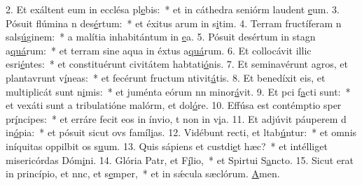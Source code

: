 2. Et exáltent eum in ecclésa pl\uline{e}bis:~* et in cáthedra seniórm laudent \uline{e}um.
3. Pósuit flúmina n des\uline{é}rtum:~* et éxitus arum in s\uline{i}tim.
4. Terram fructíferam n sals\uline{ú}ginem:~* a malítia inhabitántum in \uline{e}a.
5. Pósuit desértum in stagn a\uline{quá}rum:~* et terram sine aqua in éxtus a\uline{quá}rum.
6. Et collocávit illic esri\uline{é}ntes:~* et constituérunt civitátem habtati\uline{ó}nis.
7. Et seminavérunt agros, et plantavrunt v\uline{í}neas:~* et fecérunt fructum ntivit\uline{á}tis.
8. Et benedíxit eis, et multiplicát sunt n\uline{i}mis:~* et juménta eórum nn minor\uline{á}vit.
9. Et pci f\uline{a}cti sunt:~* et vexáti sunt a tribulatióne malórm, et dol\uline{ó}re.
10. Effúsa est contémptio sper pr\uline{í}ncipes:~* et erráre fecit eos in ínvio, t non in v\uline{i}a.
11. Et adjúvit páuperem d in\uline{ó}pia:~* et pósuit sicut ovs famíl\uline{i}as.
12. Vidébunt recti, et ltab\uline{ú}ntur:~* et omnis iníquitas oppilbit os s\uline{u}um.
13. Quis sápiens et custdi\uline{e}t hæc?~* et intélliget misericórdas Dóm\uline{i}ni.
14. Glória Patr, et F\uline{í}lio,~* et Spirtui S\uline{a}ncto.
15. Sicut erat in princípio, et nnc, et s\uline{e}mper,~* et in sǽcula sæclórum. \uline{A}men.
